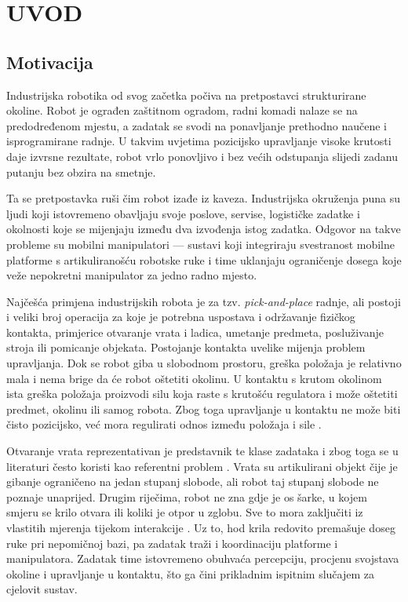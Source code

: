 \chapter{UVOD}
\label{ch:uvod}

\section{Motivacija}
\label{sec:motivacija}

Industrijska robotika od svog začetka počiva na pretpostavci strukturirane okoline. Robot je
ograđen zaštitnom ogradom, radni komadi nalaze se na predodređenom mjestu, a zadatak
se svodi na ponavljanje prethodno naučene i isprogramirane radnje. U takvim uvjetima pozicijsko
upravljanje visoke krutosti daje izvrsne rezultate, robot vrlo ponovljivo i bez većih odstupanja
slijedi zadanu putanju bez obzira na smetnje.

Ta se pretpostavka ruši čim robot izađe iz kaveza. Industrijska okruženja puna su ljudi koji
istovremeno obavljaju svoje poslove, servise, logističke zadatke i okolnosti koje se mijenjaju
između dva izvođenja istog zadatka. Odgovor na takve probleme su mobilni manipulatori ---
sustavi koji integriraju svestranost mobilne platforme s artikuliranošću robotske ruke i time
uklanjaju ograničenje dosega koje veže nepokretni manipulator za jedno radno mjesto.

Najčešća primjena industrijskih robota je za tzv. \textit{pick-and-place} radnje, ali postoji
i veliki broj operacija za koje je potrebna uspostava i održavanje fizičkog kontakta, primjerice
otvaranje vrata i ladica, umetanje predmeta, posluživanje stroja ili pomicanje objekata.
Postojanje kontakta uvelike mijenja problem upravljanja. Dok se robot giba u slobodnom prostoru,
greška položaja je relativno mala i nema brige da će robot oštetiti okolinu.
U kontaktu s krutom okolinom ista greška položaja proizvodi silu koja raste s krutošću regulatora
i može oštetiti predmet, okolinu ili samog robota. Zbog toga upravljanje u kontaktu ne može biti
čisto pozicijsko, već mora regulirati odnos između položaja i sile \cite{raibert1981hybrid}.

Otvaranje vrata reprezentativan je predstavnik te klase zadataka i zbog toga se u literaturi
često koristi kao referentni problem \cite{ott2005door}. Vrata su artikulirani objekt čije je
gibanje ograničeno na jedan stupanj slobode, ali robot taj stupanj slobode ne poznaje unaprijed.
Drugim riječima, robot ne zna gdje je os šarke, u kojem smjeru se krilo otvara ili koliki je
otpor u zglobu. Sve to mora zaključiti iz vlastitih mjerenja tijekom interakcije
\cite{sturm2011probabilistic}. Uz to, hod krila redovito premašuje doseg ruke pri nepomičnoj
bazi, pa zadatak traži i koordinaciju platforme i manipulatora. Zadatak time istovremeno
obuhvaća percepciju, procjenu svojstava okoline i upravljanje u kontaktu, što ga čini prikladnim
ispitnim slučajem za cjelovit sustav.

